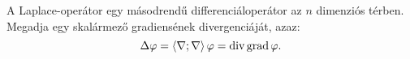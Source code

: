 \documentclass{szb-practice}
\begin{document}
\begin{definition}
  A Laplace-operátor egy másodrendű differenciáloperátor az $n$ dimenziós
  térben. Megadja egy skalármező gradiensének divergenciáját, azaz:
  $$
    \Delta \varphi
    = \left\langle\nabla;\nabla\right\rangle \varphi
    = \operatorname{div} \operatorname{grad} \varphi
    \text.
  $$
\end{definition}



\end{document}
